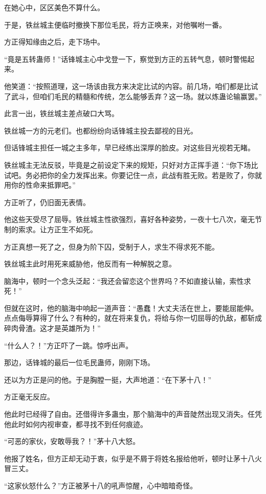 \begin{this_body}
在她心中，区区美色不算什么。

于是，铁丝城主便临时撤换下那位毛民，将方正唤来，对他嘱咐一番。

方正得知缘由之后，走下场中。

“竟是五转蛊师！”话锋城主心中戈登一下，察觉到方正的五转气息，顿时警惕起来。

他笑道：“按照道理，这一场该由我方来决定比试的内容。前几场，咱们都是比试了武斗，但咱们毛民的精髓和传统，怎么能够丢弃？这一场。就以炼蛊论输赢罢。”

此言一出，铁丝城主差点破口大骂。

铁丝城一方的元老们。也都纷纷向话锋城主投去鄙视的目光。

但话锋城主担任一城之主多年，早已经练出深厚的脸皮。对这些目光视若无睹。

铁丝城主无法反驳，毕竟是之前设定下来的规矩，只好对方正挥手道：“你下场比试吧。务必把你的全力发挥出来。你要记住一点，此战有胜无败。若是败了，你就用你的性命来抵罪吧。”

方正听了，仍旧面无表情。

他这些天受尽了屈辱。铁丝城主性欲强烈，喜好各种姿势，一夜十七八次，毫无节制的索求。让方正生不如死。

方正真想一死了之，但身为阶下囚，受制于人，求生不得求死不能。

铁丝城主此时用死来威胁他，他反而有一种解脱之意。

脑海中，顿时一个念头泛起：“我还会留恋这个世界吗？不如直接认输，索性求死！”

但就在这时，他的脑海中响起一道声音：“愚蠢！大丈夫活在世上，要能屈能伸。点点侮辱算得了什么？有种的，就在将来复仇，将给与你一切屈辱的仇敌，都斩成碎肉骨渣。这才是英雄所为！”

“什么人？！”方正吓了一跳。惊呼出声。

那边，话锋城的最后一位毛民蛊师，刚刚下场。

还以为方正是问的他。于是胸膛一挺，大声地道：“在下茅十八！”

方正毫无反应。

他此时已经得了自由。还借得许多蛊虫，那个脑海中的声音陡然出现又消失。任凭他此时如何内视审查，都寻找不到任何痕迹。

“可恶的家伙，安敢辱我？！”茅十八大怒。

他报了姓名，但方正却无动于衷，似乎是不屑于将姓名报给他听，顿时让茅十八火冒三丈。

“这家伙怒什么？”方正被茅十八的吼声惊醒，心中暗暗奇怪。


\end{this_body}
